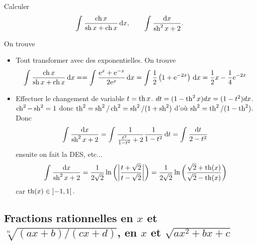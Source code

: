\documentclass{magnolia}
\begin{document}
\begin{exoUnique}
\exo Calculer
  \[\prim{\frac{\ch x}{\sh x+\ch x}}{x}, \qquad
    \priminv{\sh^2 x+2}{x}.\]
  \begin{sol}
  On trouve
  \begin{itemize}
  \item Tout transformer avec des exponentielles. On trouve
    \[\prim{\frac{\ch x}{\sh x+\ch x}}{x}==\prim{\frac{\e^x+\e^{-x}}{2\e^x}}{x}=\prim{\frac{1}{2}\p{1+\e^{-2x}}}{x}=\frac{1}{2}x
      -\frac{1}{4}e^{-2x}\]
  \item Effectuer le changement de variable $t=\th x$. $dt=(1-\th^2 x)dx=(1-t^2)dx$. $\ch^2-\sh^2=1$ donc $\th^2=\sh^2/\ch^2=\sh^2/(1+\sh^2)$ d'où $\sh^2=\th^2/(1-\th^2)$. Donc 
  $$\priminv{\sh^2 x+2}{x}=\prim{\frac{1}{\frac{t^2}{1-t^2}+2}\frac{1}{1-t^2}}{t}=\priminv{2-t^2}{t}$$ ensuite on fait la DES, etc...
  $$\priminv{\sh^2 x+2}{x}=\frac{1}{2\sqrt{2}}\ln\p{\abs{\frac{t+\sqrt{2}}{t-\sqrt{2}}}}=\frac{1}{2\sqrt{2}}\ln\p{\frac{\sqrt{2}+\th(x)}{\sqrt{2}-\th(x)}}$$ car $\th(x)\in \intero{-1}{1}.$

  \end{itemize}
  \end{sol}
\end{exoUnique}

\subsection{Fractions rationnelles en $x$ et $\sqrt[n]{(ax+b)/(cx+d)}$, en $x$ et $\sqrt{ax^2+bx+c}$}
\end{document}
